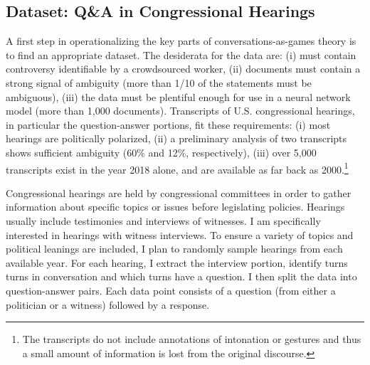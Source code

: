 \subsection{Dataset: Q\&A in Congressional Hearings}
A first step in operationalizing the key parts of conversations-as-games theory is to find an appropriate dataset. The desiderata for the data are: (i) must contain controversy identifiable by a crowdsourced worker, (ii) documents must contain a strong signal of ambiguity (more than 1/10 of the statements must be ambiguous), (iii) the data must be plentiful enough for use in a neural network model (more than 1,000 documents). Transcripts of U.S. congressional hearings, in particular the question-answer portions, fit these requirements: (i) most hearings are politically polarized, (ii) a preliminary analysis of two transcripts shows sufficient ambiguity (60\% and 12\%, respectively), (iii) over 5,000 transcripts exist in the year 2018 alone, and are available as far back as 2000.\footnote{The transcripts do not include annotations of intonation or gestures and thus a small amount of information is lost from the original discourse.}

Congressional hearings are held by congressional committees in order to gather information about specific topics or issues before legislating policies. Hearings usually include testimonies and interviews of witnesses. I am specifically interested in hearings with witness interviews. To ensure a variety of topics and political leanings are included, I plan to randomly sample hearings from each available year. For each hearing, I extract the interview portion, identify turns turns in conversation and which turns have a question. I then split the data into question-answer pairs. Each data point consists of a question (from either a politician or a witness) followed by a response.

